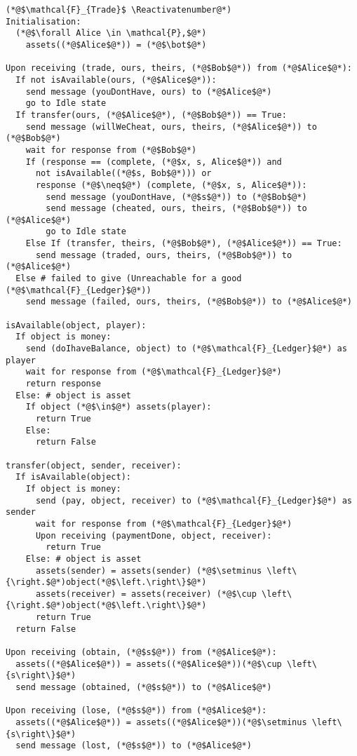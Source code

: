\Suppressnumber
\begin{lstlisting}[label=tradefunc, style=numbers]
(*@$\mathcal{F}_{Trade}$ \Reactivatenumber@*)
Initialisation:
  (*@$\forall Alice \in \mathcal{P},$@*)
    assets((*@$Alice$@*)) = (*@$\bot$@*)

Upon receiving (trade, ours, theirs, (*@$Bob$@*)) from (*@$Alice$@*):
  If not isAvailable(ours, (*@$Alice$@*)):
    send message (youDontHave, ours) to (*@$Alice$@*)
    go to Idle state
  If transfer(ours, (*@$Alice$@*), (*@$Bob$@*)) == True:
    send message (willWeCheat, ours, theirs, (*@$Alice$@*)) to (*@$Bob$@*)
    wait for response from (*@$Bob$@*)
    If (response == (complete, (*@$x, s, Alice$@*)) and
      not isAvailable((*@$s, Bob$@*))) or
      response (*@$\neq$@*) (complete, (*@$x, s, Alice$@*)):
        send message (youDontHave, (*@$s$@*)) to (*@$Bob$@*)
        send message (cheated, ours, theirs, (*@$Bob$@*)) to (*@$Alice$@*)
        go to Idle state
    Else If (transfer, theirs, (*@$Bob$@*), (*@$Alice$@*)) == True:
      send message (traded, ours, theirs, (*@$Bob$@*)) to (*@$Alice$@*)
  Else # failed to give (Unreachable for a good (*@$\mathcal{F}_{Ledger}$@*))
    send message (failed, ours, theirs, (*@$Bob$@*)) to (*@$Alice$@*)

isAvailable(object, player):
  If object is money:
    send (doIhaveBalance, object) to (*@$\mathcal{F}_{Ledger}$@*) as player
    wait for response from (*@$\mathcal{F}_{Ledger}$@*)
    return response
  Else: # object is asset
    If object (*@$\in$@*) assets(player):
      return True
    Else:
      return False

transfer(object, sender, receiver):
  If isAvailable(object):
    If object is money:
      send (pay, object, receiver) to (*@$\mathcal{F}_{Ledger}$@*) as sender
      wait for response from (*@$\mathcal{F}_{Ledger}$@*)
      Upon receiving (paymentDone, object, receiver):
        return True
    Else: # object is asset
      assets(sender) = assets(sender) (*@$\setminus \left\{\right.$@*)object(*@$\left.\right\}$@*)
      assets(receiver) = assets(receiver) (*@$\cup \left\{\right.$@*)object(*@$\left.\right\}$@*)
      return True
  return False

Upon receiving (obtain, (*@$s$@*)) from (*@$Alice$@*):
  assets((*@$Alice$@*)) = assets((*@$Alice$@*))(*@$\cup \left\{s\right\}$@*)
  send message (obtained, (*@$s$@*)) to (*@$Alice$@*)

Upon receiving (lose, (*@$s$@*)) from (*@$Alice$@*):
  assets((*@$Alice$@*)) = assets((*@$Alice$@*))(*@$\setminus \left\{s\right\}$@*)
  send message (lost, (*@$s$@*)) to (*@$Alice$@*)
\end{lstlisting}
